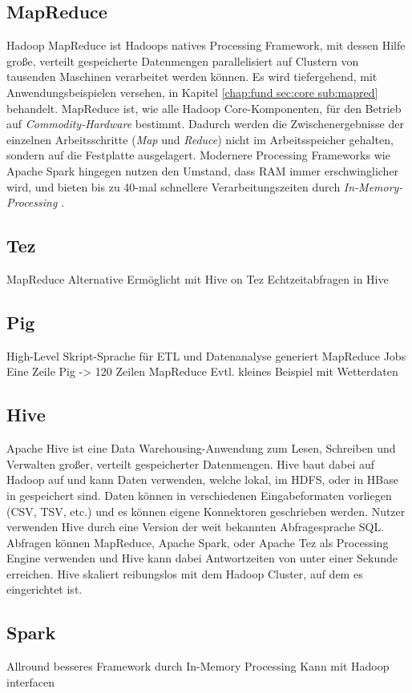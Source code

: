 \subsection{MapReduce}
Hadoop MapReduce ist Hadoops natives Processing Framework, mit dessen Hilfe große, verteilt gespeicherte Datenmengen parallelisiert auf Clustern von tausenden Maschinen verarbeitet werden können. Es wird tiefergehend, mit Anwendungsbeispielen versehen, in Kapitel \ref{chap:fund sec:core sub:mapred} behandelt. MapReduce ist, wie alle Hadoop Core-Komponenten, für den Betrieb auf \textit{Commodity-Hardware} bestimmt. Dadurch werden die Zwischenergebnisse der einzelnen Arbeitsschritte (\textit{Map} und \textit{Reduce}) nicht im Arbeitsspeicher gehalten, sondern auf die Festplatte ausgelagert. Modernere Processing Frameworks wie Apache Spark hingegen nutzen den Umstand, dass RAM immer erschwinglicher wird, und bieten bis zu 40-mal schnellere Verarbeitungszeiten durch \textit{In-Memory-Processing} \cite[vgl.][Kap. 3.19]{freiknecht_big_2018}.
\subsection{Tez}
MapReduce Alternative
Ermöglicht mit Hive on Tez Echtzeitabfragen in Hive
\subsection{Pig}
High-Level Skript-Sprache für ETL und Datenanalyse
generiert MapReduce Jobs
Eine Zeile Pig -> 120 Zeilen MapReduce
Evtl. kleines Beispiel mit Wetterdaten
\subsection{Hive}
Apache Hive ist eine Data Warehousing-Anwendung zum Lesen, Schreiben und Verwalten großer, verteilt gespeicherter Datenmengen. Hive baut dabei auf Hadoop auf und kann Daten verwenden, welche lokal, im HDFS, oder in HBase in gespeichert sind. Daten können in verschiedenen Eingabeformaten vorliegen (CSV, TSV, etc.) und es können eigene Konnektoren geschrieben werden. Nutzer verwenden Hive durch eine Version der weit bekannten Abfragesprache SQL. Abfragen können MapReduce, Apache Spark, oder Apache Tez als Processing Engine verwenden und Hive kann dabei Antwortzeiten von unter einer Sekunde erreichen. Hive skaliert reibungslos mit dem Hadoop Cluster, auf dem es eingerichtet ist.\parencite{noauthor_apache_2020}
\subsection{Spark}
Allround besseres Framework durch In-Memory Processing
Kann mit Hadoop interfacen
